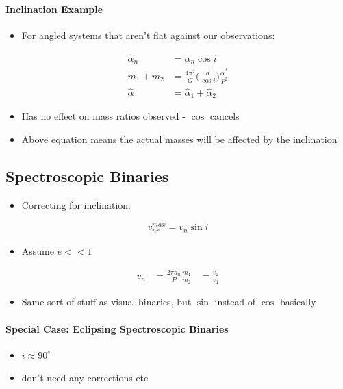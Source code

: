 \documentclass[a4paper,11pt,normalem]{article}
\begin{document}
\paragraph{Inclination Example}
\begin{itemize}
    \item For angled systems that aren't flat against our observations:
\end{itemize}
\begin{align*}
    \hat{\alpha}_n &= \alpha_n \cos i\\
    m_1 + m_2 &= \frac{4\pi^2}{G} \Big(\frac{d}{\cos i}\Big)\frac{\hat{\alpha}^3}{P^2}\\
    \hat{\alpha} &= \hat{\alpha}_1 + \hat{\alpha}_2
\end{align*}
\begin{itemize}
    \item Has no effect on mass ratios observed - \(\cos\) cancels
    \item Above equation means the actual masses will be affected by the inclination
\end{itemize}

\subsection{Spectroscopic Binaries}
\begin{itemize}
\item Correcting for inclination:
\end{itemize}
\begin{align*}
    v_{nr}^{max} = v_n \sin i
\end{align*}
\begin{itemize}
    \item Assume \(e << 1\)
\end{itemize}
\begin{align*}
    v_n &= \frac{2\pi a_n}{P}
    \frac{m_1}{m_2} &= \frac{v_2}{v_1}
\end{align*}
\begin{itemize}
    \item Same sort of stuff as visual binaries, but \(\sin\) instead of \(\cos\) basically
\end{itemize}

\paragraph{Special Case: Eclipsing Spectroscopic Binaries}
\begin{itemize}
    \item \(i \approx 90^\circ\)
    \item don't need any corrections etc
\end{itemize}
\end{document}
